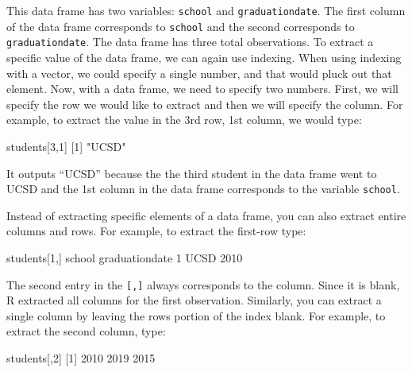 \documentclass[
]{book}
\newenvironment{Shaded}{\begin{snugshade}}{\end{snugshade}}
\newcommand{\DecValTok}[1]{\textcolor[rgb]{0.00,0.00,0.81}{#1}}
\newcommand{\NormalTok}[1]{#1}
\newcommand{\StringTok}[1]{\textcolor[rgb]{0.31,0.60,0.02}{#1}}
\begin{document}
This data frame has two variables: \texttt{school} and \texttt{graduationdate}. The first column of the data frame corresponds to \texttt{school} and the second corresponds to \texttt{graduationdate}. The data frame has three total observations. To extract a specific value of the data frame, we can again use indexing. When using indexing with a vector, we could specify a single number, and that would pluck out that element. Now, with a data frame, we need to specify two numbers. First, we will specify the row we would like to extract and then we will specify the column. For example, to extract the value in the 3rd row, 1st column, we would type:

\begin{Shaded}
\begin{Highlighting}[]
\NormalTok{students[}\DecValTok{3}\NormalTok{,}\DecValTok{1}\NormalTok{]}
\NormalTok{[}\DecValTok{1}\NormalTok{] }\StringTok{"UCSD"}
\end{Highlighting}
\end{Shaded}

It outputs ``UCSD'' because the the third student in the data frame went to UCSD and the 1st column in the data frame corresponds to the variable \texttt{school}.

Instead of extracting specific elements of a data frame, you can also extract entire columns and rows. For example, to extract the first-row type:

\begin{Shaded}
\begin{Highlighting}[]
\NormalTok{students[}\DecValTok{1}\NormalTok{,]}
\NormalTok{  school graduationdate}
\DecValTok{1}\NormalTok{   UCSD           }\DecValTok{2010}
\end{Highlighting}
\end{Shaded}

The second entry in the \texttt{{[},{]}} always corresponds to the column. Since it is blank, R extracted all columns for the first observation. Similarly, you can extract a single column by leaving the rows portion of the index blank. For example, to extract the second column, type:

\begin{Shaded}
\begin{Highlighting}[]
\NormalTok{students[,}\DecValTok{2}\NormalTok{]}
\NormalTok{[}\DecValTok{1}\NormalTok{] }\DecValTok{2010} \DecValTok{2019} \DecValTok{2015}
\end{Highlighting}
\end{Shaded}
\end{document}
